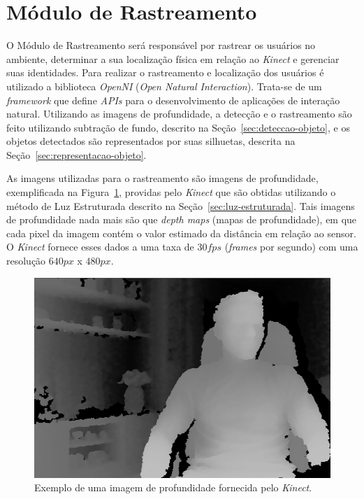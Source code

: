 \section{Módulo de Rastreamento}

	O Módulo de Rastreamento será responsável por rastrear os usuários no
	ambiente, determinar a sua localização física em relação ao \textit{Kinect} e
	gerenciar suas identidades. Para realizar o rastreamento e localização dos
	usuários é utilizado a biblioteca \textit{OpenNI} (\textit{Open Natural
	Interaction}). Trata-se de um \textit{framework} que define \textit{APIs} para
	o desenvolvimento de aplicações de interação natural. Utilizando as imagens de
	profundidade, a detecção e o rastreamento são feito utilizando subtração de
	fundo, descrito na Seção~\ref{sec:deteccao-objeto}, e os objetos detectados são
	representados por suas silhuetas, descrita na
	Seção~\ref{sec:representacao-objeto}.

	As imagens utilizadas para o rastreamento são imagens de profundidade,
	exemplificada na Figura~\ref{fig:depthmaps}, providas pelo \textit{Kinect} que
	são obtidas utilizando o método de Luz Estruturada descrito na
	Seção~\ref{sec:luz-estruturada}. Tais imagens de profundidade nada mais são
	que \textit{depth maps} (mapas de profundidade), em que cada pixel da imagem
	contém o valor estimado da distância em relação ao sensor. O \textit{Kinect}
	fornece esses dados a uma taxa de $\displaystyle 30 fps$ (\textit{frames} por
	segundo) com uma resolução $\displaystyle 640px$ x $\displaystyle 480px$.
	

	\begin{figure}[H]
		\begin{center}
			\includegraphics[scale=0.4]{figuras/4.ProblemaEProposta/mapa-profundidade.png}
		\end{center}
		\caption{Exemplo de uma imagem de profundidade fornecida pelo \textit{Kinect}.}
		\label{fig:depthmaps}
	\end{figure}

